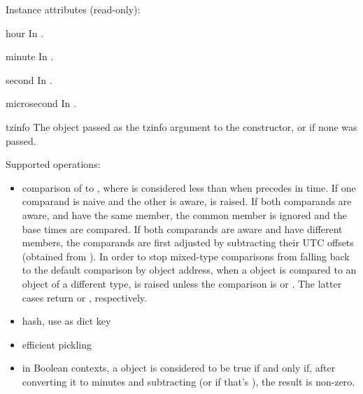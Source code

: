 Instance attributes (read-only):

\begin{memberdesc}{hour}
  In .
\end{memberdesc}

\begin{memberdesc}{minute}
  In .
\end{memberdesc}

\begin{memberdesc}{second}
  In .
\end{memberdesc}

\begin{memberdesc}{microsecond}
  In .
\end{memberdesc}

\begin{memberdesc}{tzinfo}
  The object passed as the tzinfo argument to the 
  constructor, or  if none was passed.
\end{memberdesc}

Supported operations:

\begin{itemize}
  \item
    comparison of  to ,
    where  is considered less than  when  precedes
     in time.  If one comparand is naive and the other is aware,
     is raised.  If both comparands are aware, and
    have the same  member, the common 
    member is ignored and the base times are compared.  If both
    comparands are aware and have different  members,
    the comparands are first adjusted by subtracting their UTC offsets
    (obtained from ).
    In order to stop mixed-type comparisons from falling back to the
    default comparison by object address, when a  object is
    compared to an object of a different type,  is
    raised unless the comparison is \code{==} or \code{!=}.  The latter
    cases return  or , respectively.

  \item
    hash, use as dict key

  \item
    efficient pickling

  \item
    in Boolean contexts, a  object is considered to be
    true if and only if, after converting it to minutes and
    subtracting  (or  if that's
    ), the result is non-zero.
\end{itemize}

